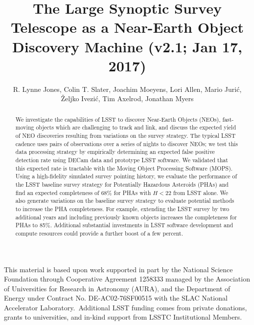 \documentclass[12pt,preprint]{aastex}
\begin{document}
\title{The Large Synoptic Survey Telescope as a Near-Earth Object Discovery Machine (v2.1; Jan 17, 2017)}

\author{R. Lynne Jones,
Colin T. Slater,
Joachim Moeyens,
Lori Allen,
Mario Juri\'{c},
\v{Z}eljko Ivezi\'{c},
Tim Axelrod,
Jonathan Myers
}

\begin{abstract}
We investigate the capabilities of LSST to discover Near-Earth Objects (NEOs), fast-moving objects
which are challenging to track and link, and discuss the expected yield of NEO discoveries
resulting from variations on the survey strategy. The typical LSST cadence uses pairs of observations
over a series of nights to discover NEOs; we test this data processing strategy by empirically determining
an expected false positive detection rate using DECam data and prototype LSST software. We validated
that this expected rate is tractable with the Moving Object Processing Software (MOPS). Using a high-fidelity 
simulated survey pointing history, we evaluate the performance of the LSST baseline survey strategy for 
Potentially Hazardous Asteroids (PHAs) and find an expected completeness of 68\% for PHAs with $H<22$ 
from LSST alone. We also generate variations on the baseline survey strategy to evaluate potential methods 
to increase the PHA completeness. For example, extending the LSST survey by two additional years and 
including previously known objects increases the completeness for PHAs to 85\%. Additional substantial
investments in LSST software development and compute resources could provide a further boost of a
few percent. 
\end{abstract}














\acknowledgements
This material is based upon work supported in part by the National Science
Foundation through Cooperative Agreement 1258333 managed by the Association of
Universities for Research in Astronomy (AURA), and the Department of Energy
under Contract No. DE-AC02-76SF00515 with the SLAC National Accelerator
Laboratory. Additional LSST funding comes from private donations, grants to
universities, and in-kind support from LSSTC Institutional Members.

\appendix




\end{document}
